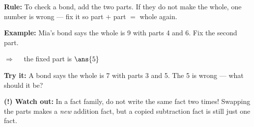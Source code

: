 \documentclass[12pt]{article}
\begin{document}

\begin{formulabox}
\textbf{Rule:} To check a bond, add the two parts. If they do not make the
whole, one number is wrong --- fix it so part $+$ part $=$ whole again.
\end{formulabox}

\begin{examplebox}
\textbf{Example:} \quad Mia's bond says the whole is 9 with parts 4 and 6.
Fix the second part.

$\Rightarrow\quad$ the fixed part is $\ans{5}$
\end{examplebox}

\begin{tryitbox}
\textbf{Try it:} \quad A bond says the whole is 7 with parts 3 and 5. The 5
is wrong --- what should it be?\\[2pt]
\end{tryitbox}

\begin{watchoutbox}
\textbf{(!) Watch out:} In a fact family, do not write the same fact two
times! Swapping the parts makes a \emph{new} addition fact, but a copied
subtraction fact is still just one fact.
\end{watchoutbox}
\end{document}
